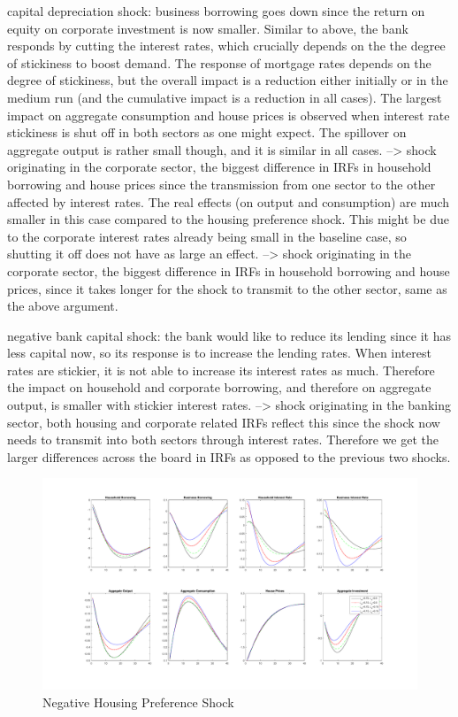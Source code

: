 \documentclass[12pt]{article}
\numberwithin{equation}{section}
\begin{document}
capital depreciation shock: business borrowing goes down since the return on equity on corporate investment is now smaller. Similar to above, the bank responds by cutting the interest rates, which crucially depends on the the degree of stickiness to boost demand. The response of mortgage rates depends on the degree of stickiness, but the overall impact is a reduction either initially or in the medium run (and the cumulative impact is a reduction in all cases). 
The largest impact on aggregate consumption and house prices is observed when interest rate stickiness is shut off in both sectors as one might expect. The spillover on aggregate output is rather small though, and it is similar in all cases. 
--> shock originating in the corporate sector, the biggest difference in IRFs in household borrowing and house prices since the transmission from one sector to the other affected by interest rates. The real effects (on output and consumption) are much smaller in this case compared to the housing preference shock. This might be due to the corporate interest rates already being small in the baseline case, so shutting it off does not have as large an effect.
--> shock originating in the corporate sector, the biggest difference in IRFs in household borrowing and house prices, since it takes longer for the shock to transmit to the other sector, same as the above argument.

negative bank capital shock: the bank would like to reduce its lending since it has less capital now, so its response is to increase the lending rates. When interest rates are stickier, it is not able to increase its interest rates as much. Therefore the impact on household and corporate borrowing, and therefore on aggregate output, is smaller with stickier interest rates. 
--> shock originating in the banking sector, both housing and corporate related IRFs reflect this since the shock now needs to transmit into both sectors through interest rates. Therefore we get the larger differences across the board in IRFs as opposed to the previous two shocks. 



\begin{figure}[H]
\centering
\caption{Negative Housing Preference Shock}
\includegraphics[scale=0.4]{stickinessNegativeShocksJ.pdf}
\end{figure}
\end{document}
